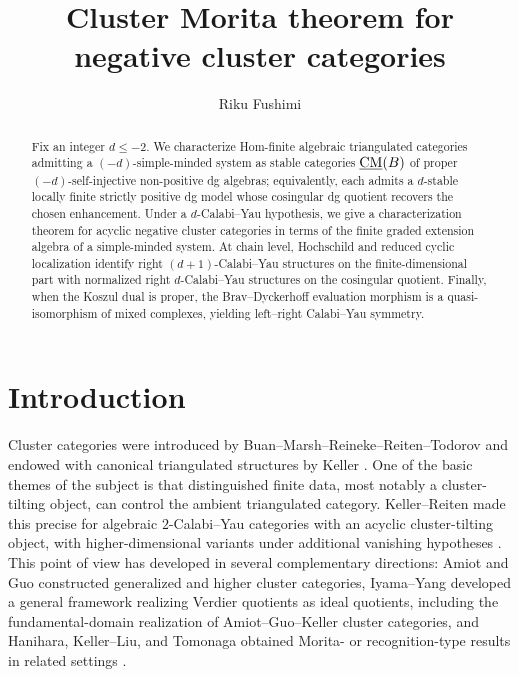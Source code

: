 \documentclass[11pt,a4paper,dvipsnames,x11names]{amsart}
\title[Cluster Morita theorem for negative cluster categories]{Cluster Morita theorem for negative cluster categories}
\author{Riku Fushimi}
\date{}
\begin{document}
\begin{abstract}
Fix an integer $d\leq-2$. We characterize Hom-finite algebraic triangulated categories admitting a $(-d)$-simple-minded system as stable categories $\underline{\operatorname{CM}}(B)$ of proper $(-d)$-self-injective non-positive dg algebras; equivalently, each admits a $d$-stable locally finite strictly positive dg model whose cosingular dg quotient recovers the chosen enhancement. Under a $d$-Calabi--Yau hypothesis, we give a characterization theorem for acyclic negative cluster categories in terms of the finite graded extension algebra of a simple-minded system. At chain level, Hochschild and reduced cyclic localization identify right $(d+1)$-Calabi--Yau structures on the finite-dimensional part with normalized right $d$-Calabi--Yau structures on the cosingular quotient. Finally, when the Koszul dual is proper, the Brav--Dyckerhoff evaluation morphism is a quasi-isomorphism of mixed complexes, yielding left--right Calabi--Yau symmetry.
\end{abstract}

\maketitle

\setcounter{tocdepth}{1}
\tableofcontents

\section{Introduction}

Cluster categories were introduced by Buan--Marsh--Reineke--Reiten--Todorov and endowed with canonical triangulated structures by Keller \cite{BMRRT06,Keller05}. One of the basic themes of the subject is that distinguished finite data, most notably a cluster-tilting object, can control the ambient triangulated category. Keller--Reiten made this precise for algebraic $2$-Calabi--Yau categories with an acyclic cluster-tilting object, with higher-dimensional variants under additional vanishing hypotheses \cite{KR08}. This point of view has developed in several complementary directions: Amiot and Guo constructed generalized and higher cluster categories, Iyama--Yang developed a general framework realizing Verdier quotients as ideal quotients, including the fundamental-domain realization of Amiot--Guo--Keller cluster categories, and Hanihara, Keller--Liu, and Tomonaga obtained Morita- or recognition-type results in related settings \cite{Amiot09,Guo11,IY20,Hanihara22,KellerLiuAmiot24,Tomonaga26}.
\end{document}
